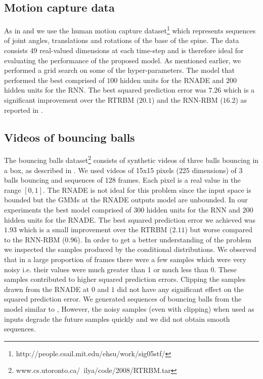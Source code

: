 \documentclass{article} %
\begin{document}
\subsection{Motion capture data}
As in \cite{Sutskever2008} and \cite{Boulanger-Lewandowski2012} we use the human motion capture dataset\footnote{http://people.csail.mit.edu/ehsu/work/sig05stf/} which represents sequences of joint angles, translations and rotations of the base of the spine. The data consists 49 real-valued dimensions at each time-step and is therefore ideal for evaluating the performance of the proposed model. As mentioned earlier, we performed a grid search on some of the hyper-parameters. The model that performed the best comprised of $100$ hidden units for the RNADE and $200$ hidden units for the RNN. The best squared prediction error was $\mathbf{7.26}$ which is a significant improvement over the RTRBM ($20.1$) and the RNN-RBM ($16.2$) as reported in \cite{Boulanger-Lewandowski2012}. 

\subsection{Videos of bouncing balls}
The bouncing balls dataset\footnote{www.cs.utoronto.ca/~ilya/code/2008/RTRBM.tar} consists of synthetic videos of three balls bouncing in a box, as described in \cite{Sutskever2008}. We used videos of 15x15 pixels (225 dimensions) of 3 balls bouncing and sequences of 128 frames. Each pixel is a real value in the range $[0,1]$. The RNADE is not ideal for this problem since the input space is bounded but the GMMs at the RNADE outputs model are unbounded. In our experiments the best model comprised of $300$ hidden units for the RNN and $200$ hidden units for the RNADE. The best squared prediction error we achieved was $1.93$ which is a small improvement over the RTRBM ($2.11$) but worse compared to the RNN-RBM ($0.96$). In order to get a better understanding of the problem we inspected the samples produced by the conditional distributions. We observed that in a large proportion of frames there were a few samples which were very noisy i.e. their values were much greater than 1 or much less than 0. These samples contributed to higher squared prediction errors. Clipping the samples drawn from the RNADE at $0$ and $1$ did not have any significant effect on the squared prediction error. We generated sequences of bouncing balls from the model similar to \cite{Sutskever2008}, However, the noisy samples (even with clipping) when used as inputs degrade the future samples quickly and we did not obtain smooth sequences. 
\end{document}

